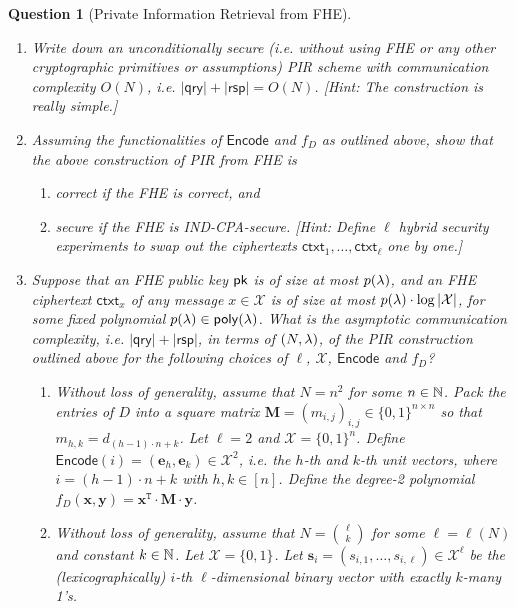 \documentclass[10pt,twoside]{article}
\theoremstyle{sltheorem}
\newtheorem{question}{Question}
\newcommand{\ctxt}{\mathsf{ctxt}}
\newcommand{\cX}{\mathcal{X}}
\newcommand{\bits}[1][]{\{0,1\}^{#1}}
\renewcommand{\vec}[1]{\mathbf{#1}}
\newcommand{\mat}[1]{\mathbf{#1}}
\newcommand{\transpose}{\mathtt{T}}
\begin{document}
\begin{question}[Private Information Retrieval from FHE]
    \begin{enumerate}[label=(\alph*)]
        \item Write down an unconditionally secure (i.e. without using FHE or any other cryptographic primitives or assumptions) PIR scheme with communication complexity $O(N)$, i.e. $|\mathsf{qry}| + |\mathsf{rsp}| = O(N)$. [Hint: The construction is really simple.]
        \item Assuming the functionalities of $\mathsf{Encode}$ and $f_D$ as outlined above, show that the above construction of PIR from FHE is
        \begin{enumerate}[label=(\roman*)]
            \item correct if the FHE is correct, and
            \item secure if the FHE is IND-CPA-secure. [Hint: Define $\ell$ hybrid security experiments to swap out the ciphertexts $\ctxt_1, \ldots, \ctxt_\ell$ one by one.]
        \end{enumerate}
        \item Suppose that an FHE public key $\pk$ is of size at most $p(\lambda)$, and an FHE ciphertext $\ctxt_x$ of any message $x \in \cX$ is of size at most $p(\secpar) \cdot \log |\cX|$, for some fixed polynomial $p(\secpar) \in \poly$. 
        What is the asymptotic communication complexity, i.e. $|\mathsf{qry}| + |\mathsf{rsp}|$, in terms of $(N, \lambda)$, of the PIR construction outlined above for the following choices of $\ell$, $\cX$, $\mathsf{Encode}$ and $f_D$?
        \begin{enumerate}[label=(\roman*)]
            \item Without loss of generality, assume that $N = n^2$ for some $n \in \mathbb{N}$. 
            Pack the entries of $D$ into a square matrix $\mat{M}= (m_{i,j})_{i,j} \in \bits[n \times n]$ so that $m_{h,k} = d_{(h-1) \cdot n + k}$.
            Let $\ell = 2$ and $\cX = \bits[n]$.
            Define $\mathsf{Encode}(i) = (\vec{e}_h, \vec{e}_k) \in \cX^2$, i.e. the $h$-th and $k$-th unit vectors, where $i = (h-1) \cdot n + k$ with $h,k \in [n]$.
            Define the degree-2 polynomial $f_D(\vec{x}, \vec{y}) = \vec{x}^\transpose \cdot \mat{M} \cdot \vec{y}$.
            \item Without loss of generality, assume that $N = \binom{\ell}{k}$ for some $\ell = \ell(N)$ and constant $k \in \mathbb{N}$.
            Let $\cX = \bits$.
            Let $\vec{s}_i = (s_{i,1},\ldots, s_{i,\ell}) \in \cX^\ell$ be the (lexicographically) $i$-th $\ell$-dimensional binary vector with exactly $k$-many 1's.

\end{enumerate}
\end{enumerate}
\end{question}
\end{document}
